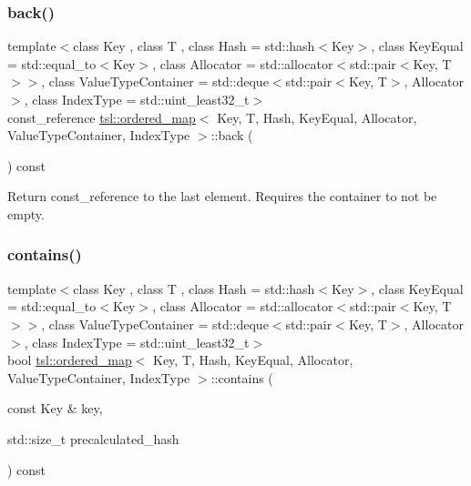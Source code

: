 \subsubsection{\texorpdfstring{back()}{back()}}
{\footnotesize\ttfamily template$<$class Key , class T , class Hash  = std\+::hash$<$\+Key$>$, class Key\+Equal  = std\+::equal\+\_\+to$<$\+Key$>$, class Allocator  = std\+::allocator$<$std\+::pair$<$\+Key, T$>$$>$, class Value\+Type\+Container  = std\+::deque$<$std\+::pair$<$\+Key, T$>$, Allocator$>$, class Index\+Type  = std\+::uint\+\_\+least32\+\_\+t$>$ \\
const\+\_\+reference \mbox{\hyperlink{classtsl_1_1ordered__map}{tsl\+::ordered\+\_\+map}}$<$ Key, T, Hash, Key\+Equal, Allocator, Value\+Type\+Container, Index\+Type $>$\+::back (\begin{DoxyParamCaption}{ }\end{DoxyParamCaption}) const\hspace{0.3cm}{\ttfamily [inline]}}

Return const\+\_\+reference to the last element. Requires the container to not be empty. \mbox{\label{classtsl_1_1ordered__map_a5b0dd1e82f8c3c905ea62542f6f374c9}} 
\subsubsection{\texorpdfstring{contains()}{contains()}\hspace{0.1cm}{\footnotesize\ttfamily [1/3]}}
{\footnotesize\ttfamily template$<$class Key , class T , class Hash  = std\+::hash$<$\+Key$>$, class Key\+Equal  = std\+::equal\+\_\+to$<$\+Key$>$, class Allocator  = std\+::allocator$<$std\+::pair$<$\+Key, T$>$$>$, class Value\+Type\+Container  = std\+::deque$<$std\+::pair$<$\+Key, T$>$, Allocator$>$, class Index\+Type  = std\+::uint\+\_\+least32\+\_\+t$>$ \\
bool \mbox{\hyperlink{classtsl_1_1ordered__map}{tsl\+::ordered\+\_\+map}}$<$ Key, T, Hash, Key\+Equal, Allocator, Value\+Type\+Container, Index\+Type $>$\+::contains (\begin{DoxyParamCaption}\item[{const Key \&}]{key,  }\item[{std\+::size\+\_\+t}]{precalculated\+\_\+hash }\end{DoxyParamCaption}) const\hspace{0.3cm}{\ttfamily [inline]}}


